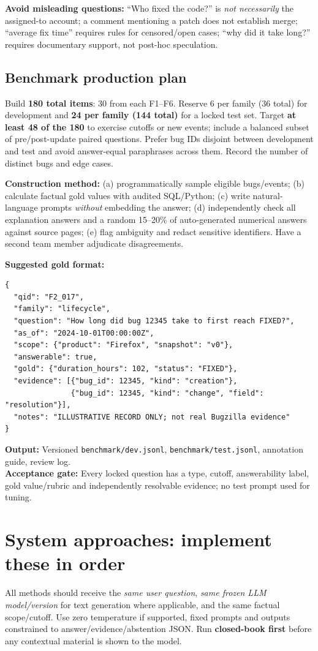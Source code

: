 \documentclass[11pt,a4paper]{article}
\newcommand{\deliver}[1]{\textbf{Output:} #1}
\newcommand{\gate}[1]{\textbf{Acceptance gate:} #1}
\begin{document}
\textbf{Avoid misleading questions:} ``Who fixed the code?'' is \emph{not necessarily} the assigned-to account; a comment mentioning a patch does not establish merge; ``average fix time'' requires rules for censored/open cases; ``why did it take long?'' requires documentary support, not post-hoc speculation.

\subsection{Benchmark production plan}
Build \textbf{180 total items}: 30 from each F1--F6. Reserve 6 per family (36 total) for development and \textbf{24 per family (144 total)} for a locked test set. Target \textbf{at least 48 of the 180} to exercise cutoffs or new events; include a balanced subset of pre/post-update paired questions. Prefer bug IDs disjoint between development and test and avoid answer-equal paraphrases across them. Record the number of distinct bugs and edge cases.

\textbf{Construction method:} (a) programmatically sample eligible bugs/events; (b) calculate factual gold values with audited SQL/Python; (c) write natural-language prompts \emph{without} embedding the answer; (d) independently check all explanation answers and a random 15--20\% of auto-generated numerical answers against source pages; (e) flag ambiguity and redact sensitive identifiers. Have a second team member adjudicate disagreements.

\textbf{Suggested gold format:}
\begin{lstlisting}
{
  "qid": "F2_017",
  "family": "lifecycle",
  "question": "How long did bug 12345 take to first reach FIXED?",
  "as_of": "2024-10-01T00:00:00Z",
  "scope": {"product": "Firefox", "snapshot": "v0"},
  "answerable": true,
  "gold": {"duration_hours": 102, "status": "FIXED"},
  "evidence": [{"bug_id": 12345, "kind": "creation"},
               {"bug_id": 12345, "kind": "change", "field": "resolution"}],
  "notes": "ILLUSTRATIVE RECORD ONLY; not real Bugzilla evidence"
}
\end{lstlisting}
\deliver{Versioned \texttt{benchmark/dev.jsonl}, \texttt{benchmark/test.jsonl}, annotation guide, review log.}\\
\gate{Every locked question has a type, cutoff, answerability label, gold value/rubric and independently resolvable evidence; no test prompt used for tuning.}

\section{System approaches: implement these in order}
All methods should receive the \emph{same user question}, \emph{same frozen LLM model/version} for text generation where applicable, and the same factual scope/cutoff. Use zero temperature if supported, fixed prompts and outputs constrained to answer/evidence/abstention JSON. Run \textbf{closed-book first} before any contextual material is shown to the model.
\end{document}
